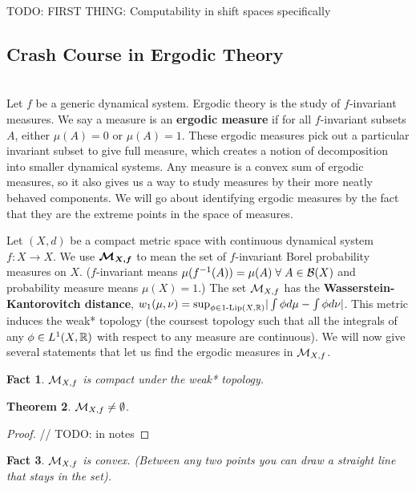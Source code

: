 \documentclass[11pt, reqno]{amsart}
\theoremstyle{plain}
\newtheorem{thm}{Theorem}[section]
\numberwithin{thm}{subsection}
\newtheorem{fact}[thm]{Fact}
\theoremstyle{definition}
\begin{document}
TODO: FIRST THING: Computability in shift spaces specifically


\subsection{Crash Course in Ergodic Theory}\cite[L10]{wolf} \\
Let $f$ be a generic dynamical system. Ergodic theory is the study of $f$-invariant measures. We say a measure is an \textbf{ergodic measure} if for all $f$-invariant subsets $A$, either $\mu(A) = 0$ or $\mu(A) = 1$. These ergodic measures pick out a particular invariant subset to give full measure, which creates a notion of decomposition into smaller dynamical systems. Any measure is a convex sum of ergodic measures, so it also gives us a way to study measures by their more neatly behaved components. We will go about identifying ergodic measures by the fact that they are the extreme points in the space of measures. 

Let $(X, d)$ be a compact metric space with continuous dynamical system $f: X \rightarrow X$. We use $\boldsymbol{\mathcal{M}_{X,f}}$ to mean the set of $f$-invariant Borel probability measures on $X$. ($f$-invariant means $\mu(f^{-1}(A)) = \mu(A) \;\forall\; A \in \mathcal{B}(X)$ and probability measure means $\mu(X) = 1$.) The set $\mathcal{M}_{X,f}$ has the \textbf{Wasserstein-Kantorovitch distance}, $w_1(\mu, \nu) = \text{sup}_{\phi \in 1\text{-Lip}(X,\mathbb{R})}|\int \phi d\mu - \int \phi d\nu|$. This metric induces the weak* topology (the coursest topology such that all the integrals of any $\phi \in L^1(X, \mathbb{R})$ with respect to any measure are continuous). We will now give several statements that let us find the ergodic measures in $\mathcal{M}_{X,f}$.

\begin{fact}
  $\mathcal{M}_{X,f}$ is compact under the weak* topology.
\end{fact}

\begin{thm}
  $\mathcal{M}_{X,f} \neq \emptyset$. 
\end{thm}

\begin{proof}
  // TODO: in notes
\end{proof}

\begin{fact}
  $\mathcal{M}_{X,f}$ is convex. (Between any two points you can draw a straight line that stays in the set).
\end{fact}
\end{document}
